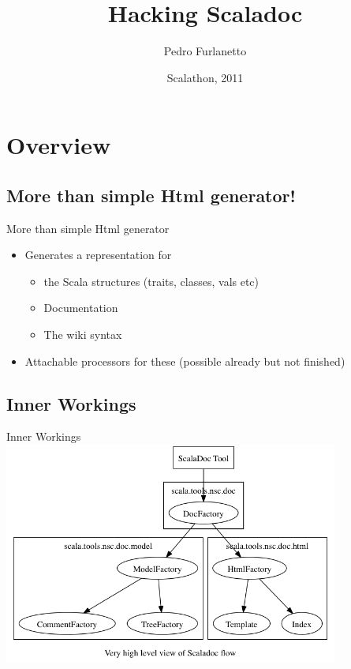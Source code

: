 \documentclass{beamer}
\title{Hacking Scaladoc}
\author{Pedro Furlanetto}
\institute
{
\begin{minipage}{0.6\textwidth}
\begin{flushleft} 
\end{flushleft}
\end{minipage}
\begin{minipage}{0.3\textwidth}
\end{minipage}
  
}
\date[Scalathon 2011] %
{Scalathon, 2011}
\begin{document}


\section{Overview}

\subsection{More than simple Html generator!}

\begin{frame}{More than simple Html generator}
	\begin{itemize} %
	\item Generates a representation for
		\begin{itemize}  
		\item the Scala structures (traits, classes, vals etc)
		\item Documentation
		\item The wiki syntax
		\end{itemize}
	\item Attachable processors for these (possible already but not finished)
	\end{itemize}
\end{frame}


\subsection{Inner Workings}
\begin{frame}{Inner Workings} 
	\includegraphics[width=11cm]{../docs/flow.png} 
\end{frame}
\end{document}
